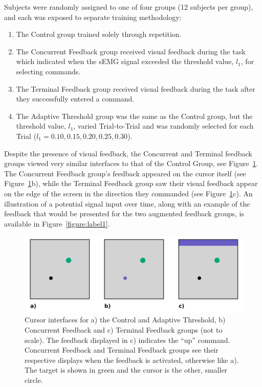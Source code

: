 Subjects were randomly assigned to one of four groups (12 subjects per group), and each was exposed to separate training methodology:
\begin{enumerate}
	\item The Control group trained solely through repetition.
	\item The Concurrent Feedback group received visual feedback during the task which indicated when the sEMG signal exceeded the threshold value, $l_1$, for selecting commands.
	\item The Terminal Feedback group received visual feedback during the task after they successfully entered a command.
	\item The Adaptive Threshold group was the same as the Control group, but the threshold value, $l_1$, varied Trial-to-Trial and was randomly selected for each Trial ($l_1 = 0.10, 0.15, 0.20, 0.25, 0.30$).
\end{enumerate}
Despite the presence of visual feedback, the Concurrent and Terminal feedback groups viewed very similar interfaces to that of the Control Group, see Figure~\ref{figure:label2}.
The Concurrent Feedback group's feedback appeared on the cursor itself (see Figure~\ref{figure:label2}b), while the Terminal Feedback group saw their visual feedback appear on the edge of the screen in the direction they commanded (see Figure~\ref{figure:label2}c).
An illustration of a potential signal input over time, along with an example of the feedback that would be presented for the two augmented feedback groups, is available in Figure~\ref{figure:label1}.

\begin{figure}[b!]
	\centering
	\includegraphics[width=.6125\textwidth]{figures/EMG/Figure2}
	\caption[Cursor interfaces]{Cursor interfaces for a) the Control and Adaptive Threshold, b) Concurrent Feedback and c) Terminal Feedback groups (not to scale).
		The feedback displayed in c) indicates the ``up'' command.
		Concurrent Feedback and Terminal Feedback groups see their respective displays when the feedback is activated, otherwise like a).
		The target is shown in green and the cursor is the other, smaller circle.}
	\label{figure:label2}
\end{figure}

